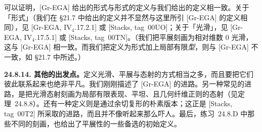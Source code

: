 可以证明，[Gr-EGA] 给出的形式\trUnramified{}与形式\trSmooth{}的定义与我们给出的定义相一致。关于「形式\trUnramified」（我们在 \S21.7 中给出的定义并不显然与这里所引 [Gr-EGA] 的定义相同），见 [Gr-EGA, IV$_4$.17.2.1] 或 [Stacks, tag~00UO]；关于「光滑」，见 [Gr-EGA, IV$_4$.17.5.1] 或 [Stacks, tag~00TN]。（我们把平展刻画为相对维数 $0$ 光滑，这与 [Gr-EGA] 相一致。而我们把\trUnramified{}定义为形式\trUnramified{}加上局部有限\emph{型}，则与 [Gr-EGA] 不一致，如 \S21.7 中所述。）

\textbf{24.8.14. 其他的出发点。}\quad 定义光滑、平展与\trUnramified{}态射的方式相当之多，而且要把它们彼此联系起来也绝非平凡。我们刚刚描述了 [Gr-EGA] 的进路。另一种常见的进路，是把光滑态射刻画为局部有限表现、平坦、且几何纤维正则的态射（见\mbox{定理~24.8.8}）。还有一种定义则是通过余切复形的朴素版本；这正是 [Stacks, tag~00T2] 所采取的进路，而且并不像听起来那么吓人。最后，\mbox{练习~24.8.D} 中那些不同的刻画，也给出了平展性的一些备选的初始定义。
